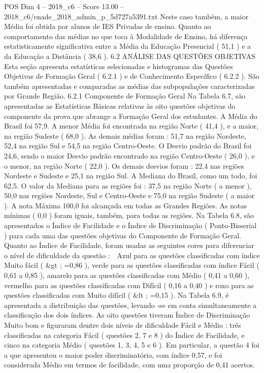 \begin{textsample}{POS Dim 4 – 2018\_c6 – Score 13.00 – 2018\_c6/enade\_2018\_admin\_p\_5d727a5391.txt}
Neste caso também, a maior Média foi obtida por alunos de IES Privadas de ensino.
Quanto ao comportamento das médias no que toca à Modalidade de Ensino, há diferença estatisticamente significativa entre a Média da Educação Presencial ( 51,1 ) e a da Educação a Distância ( 38,6 ). 6.2 ANÁLISE DAS QUESTÕES OBJETIVAS Esta seção apresenta estatísticas selecionadas e histogramas das Questões Objetivas de Formação Geral ( 6.2.1 ) e de Conhecimento Específico ( 6.2.2 ).
São também apresentadas e comparadas as médias das subpopulações caracterizadas por Grande Região. 6.2.1 Componente de Formação Geral Na Tabela 6.7, são apresentadas as Estatísticas Básicas relativas às oito questões objetivas do componente da prova que abrange a Formação Geral dos estudantes.
A Média do Brasil foi 57,9.
A menor Média foi encontrada na região Norte ( 41,4 ), e a maior, na região Sudeste ( 68,0 ).
As demais médias foram : 51,7 na região Nordeste, 52,4 na região Sul e 54,5 na região Centro-Oeste.
O Desvio padrão do Brasil foi 24,6, sendo o maior Desvio padrão encontrado na região Centro-Oeste ( 26,0 ), e o menor, na região Norte ( 22,0 ).
Os demais desvios foram : 22,4 nas regiões Nordeste e Sudeste e 25,1 na região Sul.
A Mediana do Brasil, como um todo, foi 62,5.
O valor da Mediana para as regiões foi : 37,5 na região Norte ( a menor ), 50,0 nas regiões Nordeste, Sul e Centro-Oeste e 75,0 na região Sudeste ( a maior ).
A nota Máxima 100,0 foi alcançada em todas as Grandes Regiões.
As notas mínimas ( 0,0 ) foram iguais, também, para todas as regiões.
Na Tabela 6.8, são apresentados o Índice de Facilidade e o Índice de Discriminação ( Ponto-Bisserial ) para cada uma das questões objetivas do Componente de Formação Geral.
Quanto ao Índice de Facilidade, foram usadas as seguintes cores para diferenciar o nível de dificuldade da questão :  Azul para as questões classificadas com índice Muito fácil ( \&gt ; =0,86 ), verde para as questões classificadas com índice Fácil ( 0,61 a 0,85 ), amarelo para as questões classificadas com Médio ( 0,41 a 0,60 ), vermelho para as questões classificadas com Difícil ( 0,16 a 0,40 ) e roxo para as questões classificadas com Muito difícil ( \&lt ; =0,15 ).
Na Tabela 6.9, é apresentada a distribuição das questões, levando -se em conta simultaneamente a classificação dos dois índices.
As oito questões tiveram Índice de Discriminação Muito bom e figuraram dentre dois níveis de dificuldade Fácil e Médio : três classificadas na categoria Fácil ( questões 2, 7 e 8 ) do Índice de Facilidade, e cinco na categoria Médio ( questões 1, 3, 4, 5 e 6 ).
Em particular, a questão 4 foi a que apresentou o maior poder discriminatório, com índice 0,57, e foi considerada Médio em termos de facilidade, com uma proporção de 0,41 acertos.

\end{textsample}
